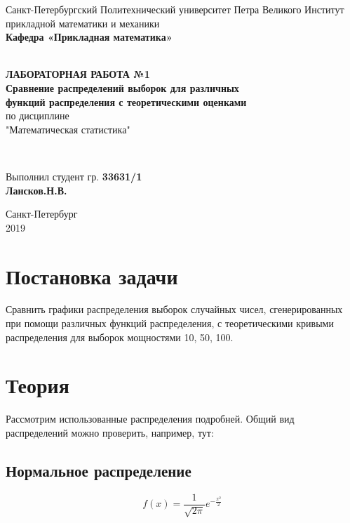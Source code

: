 \documentclass[12pt]{article}
\begin{document}
\begin{titlepage}
	\center
		Санкт-Петербургский Политехнический 
		университет Петра Великого
		Институт прикладной математики и механики
		\\ \textbf{Кафедра «Прикладная математика»}

	\vfill ~
	\textbf{
		\\ \large ЛАБОРАТОРНАЯ РАБОТА №1
		\\	\normalsize	
			Сравнение распределений выборок для различных 
		\\	функций распределения с теоретическими оценками
	}
	\\	по дисциплине 
	\\	"Математическая статистика"

	\vfill ~

	Выполнил студент гр. \textbf{33631/1} \\
	\textbf{Лансков.Н.В.} \\ 

\vfill

{\large}	Санкт-Петербург
\\ 2019
\end{titlepage}

\tableofcontents
\listoffigures
\pagebreak


\section{Постановка задачи}
Сравнить графики распределения выборок случайных чисел, сгенерированных при помощи различных функций распределения, с теоретическими кривыми распределения для выборок мощностями 10, 50, 100.

\section{Теория}
Рассмотрим использованные распределения подробней. Общий вид распределений можно проверить, например, тут: \cite{wiki}

\subsection{Нормальное распределение}

\begin{equation}
f(x)= \frac{1}{\sqrt{2\pi}}e^{-\frac{x^2}{2}}
\end{equation}
\end{document}
